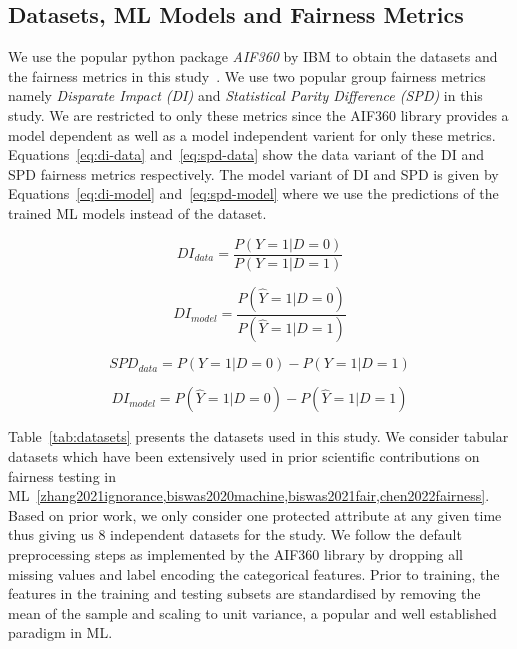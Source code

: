 \documentclass{article}
\begin{document}
\subsection{Datasets, ML Models and Fairness Metrics}\label{sec:method-parameters}

We use the popular python package \emph{AIF360} by IBM to obtain the
datasets and the fairness metrics in this study \cite{aif360}. We use
two popular group fairness metrics namely \emph{Disparate Impact (DI)}
and \emph{Statistical Parity Difference (SPD)} in this study. We are
restricted to only these metrics since the AIF360 library provides a
model dependent as well as a model independent varient for only these
metrics. Equations \ref{eq:di-data} and \ref{eq:spd-data} show the
data variant of the DI and SPD fairness metrics respectively. The
model variant of DI and SPD is given by Equations \ref{eq:di-model}
and \ref{eq:spd-model} where we use the predictions of the trained ML
models instead of the dataset.

\begin{equation}
  DI_{data} = \frac{P(Y=1|D=0)}{P(Y=1|D=1)}
  \label{eq:di-data}
\end{equation}

\begin{equation}
  DI_{model} = \frac{P(\hat{Y}=1|D=0)}{P(\hat{Y}=1|D=1)}
  \label{eq:di-model}
\end{equation}

\begin{equation}
  SPD_{data} = P(Y=1|D=0)-P(Y=1|D=1)
  \label{eq:spd-data}
\end{equation}

\begin{equation}
  DI_{model} = P(\hat{Y}=1|D=0)-P(\hat{Y}=1|D=1)
  \label{eq:spd-model}
\end{equation}

Table \ref{tab:datasets} presents the datasets used in this study. We
consider tabular datasets which have been extensively used in prior
scientific contributions on fairness testing in
ML \ref{zhang2021ignorance,biswas2020machine,biswas2021fair,chen2022fairness}.
Based on prior work, we only consider one protected attribute at any
given time thus giving us 8 independent datasets for the study. We
follow the default preprocessing steps as implemented by the AIF360
library by dropping all missing values and label encoding the
categorical features. Prior to training, the features in the training
and testing subsets are standardised by removing the mean of the
sample and scaling to unit variance, a popular and well established
paradigm in ML.
\end{document}
